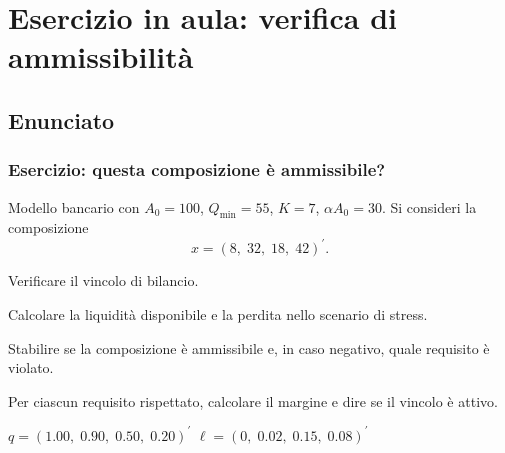 

\section{Esercizio in aula: verifica di ammissibilit\`{a}}



\subsection{Enunciato}%

\begin{frame}%
%

\frametitle{Esercizio: questa composizione \`{e} ammissibile?}%
%

%


Modello bancario con $A_{0}=100$, $Q_{\min}=55$, $K=7$, $\alpha A_{0}=30$. Si
consideri la composizione
\[
x=(8,\;32,\;18,\;42)^{\prime}.
\]


\medskip

\begin{stepenumerate}


\item[1.] Verificare il vincolo di bilancio.

\item[2.] Calcolare la liquidit\`{a} disponibile e la perdita nello scenario
di stress.

\item[3.] Stabilire se la composizione \`{e} ammissibile e, in caso negativo,
quale requisito \`{e} violato.

\item[4.] Per ciascun requisito rispettato, calcolare il margine e dire se il
vincolo \`{e} attivo.
\end{stepenumerate}

\medskip

\begin{center}
$q=(1.00,\;0.90,\;0.50,\;0.20)^{\prime}$ \qquad$\ell
=(0,\;0.02,\;0.15,\;0.08)^{\prime}$
\end{center}

%

\transboxout
\end{frame}%



